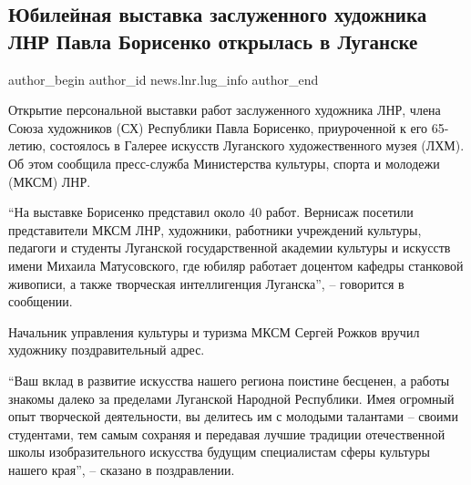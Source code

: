  
 
 
 
 
 
\subsection{Юбилейная выставка заслуженного художника ЛНР Павла Борисенко открылась в Луганске}
\label{sec:19_01_2022.stz.news.lnr.lug_info.2.vystavka_hudozhnik}
 
\ifcmt
 author_begin
   author_id news.lnr.lug_info
 author_end
\fi

Открытие персональной выставки работ заслуженного художника ЛНР, члена Союза
художников (СХ) Республики Павла Борисенко, приуроченной к его 65-летию,
состоялось в Галерее искусств Луганского художественного музея (ЛХМ). Об этом
сообщила пресс-служба Министерства культуры, спорта и молодежи (МКСМ) ЛНР.

\enquote{На выставке Борисенко представил около 40 работ. Вернисаж посетили
представители МКСМ ЛНР, художники, работники учреждений культуры, педагоги и
студенты Луганской государственной академии культуры и искусств имени Михаила
Матусовского, где юбиляр работает доцентом кафедры станковой живописи, а также
творческая интеллигенция Луганска}, – говорится в сообщении.

Начальник управления культуры и туризма МКСМ Сергей Рожков вручил художнику
поздравительный адрес.


\enquote{Ваш вклад в развитие искусства нашего региона поистине бесценен, а работы
знакомы далеко за пределами Луганской Народной Республики. Имея огромный опыт
творческой деятельности, вы делитесь им с молодыми талантами – своими
студентами, тем самым сохраняя и передавая лучшие традиции отечественной школы
изобразительного искусства будущим специалистам сферы культуры нашего края}, –
сказано в поздравлении.

